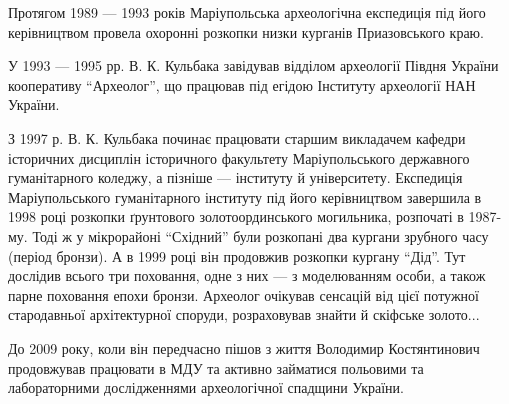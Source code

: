 Протягом 1989 — 1993 років Маріупольська археологічна експедиція під його
керівництвом провела охоронні розкопки низки курганів Приазовського краю.

У 1993 — 1995 рр. В. К. Кульбака завідував відділом археології Півдня України
кооперативу \enquote{Археолог}, що працював під егідою Інституту археології НАН
України.

З 1997 р. В. К. Кульбака починає працювати старшим викладачем кафедри
історичних дисциплін історичного факультету Маріупольського державного
гуманітарного коледжу, а пізніше — інституту й університету. Експедиція
Маріупольського гуманітарного інституту під його керівництвом завершила в 1998
році розкопки ґрунтового золотоординського могильника, розпочаті в 1987-му.
Тоді ж у мікрорайоні \enquote{Східний} були розкопані два кургани зрубного часу (період
бронзи). А в 1999 році він продовжив розкопки кургану \enquote{Дід}. Тут дослідив
всього три поховання, одне з них — з моделюванням особи, а також парне
поховання епохи бронзи. Археолог очікував сенсацій від цієї потужної
стародавньої архітектурної споруди, розраховував знайти й скіфське золото...

До 2009 року, коли він передчасно пішов з життя Володимир Костянтинович
продовжував працювати в МДУ та активно займатися польовими та лабораторними
дослідженнями археологічної спадщини України.

